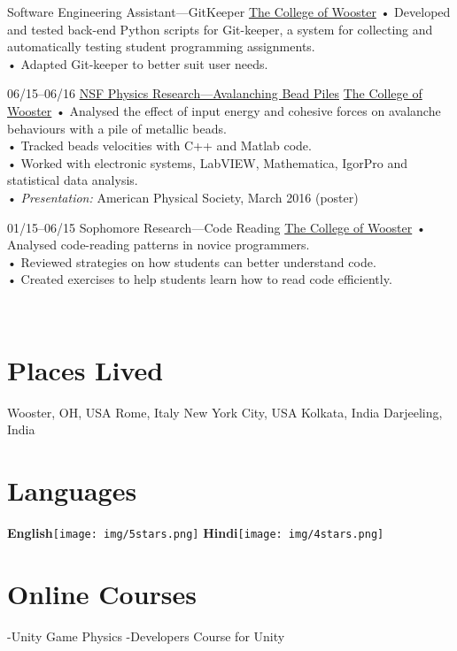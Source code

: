 \documentclass[]{friggeri-cv}
\begin{document}
\begin{entrylist}
    {Software Engineering Assistant—GitKeeper}
    {\href{https://www.wooster.edu/}{The College of Wooster}}
    {•  Developed and tested back-end Python scripts for Git-keeper, a system for collecting and automatically testing student programming assignments. \\
    •   Adapted Git-keeper to better suit user needs.\\}

    \entry
    {06/15–06/16}
    {\href{http://physics.wooster.edu/REU/projects.html}{NSF Physics Research—Avalanching Bead Piles}}
    {\href{https://www.wooster.edu/}{The College of Wooster}}
    {
    •	Analysed the effect of input energy and cohesive forces on avalanche behaviours with a pile of metallic beads.\\
    •	Tracked beads velocities with C++ and Matlab code. \\
    •   Worked with electronic systems, LabVIEW, Mathematica, IgorPro and statistical data analysis.\\
    •	\emph{Presentation:} American Physical Society, March 2016 (poster)\\}

    \entry
    {01/15–06/15}
    {Sophomore Research—Code Reading}
    {\href{https://www.wooster.edu/}{The College of Wooster}}
    {
    •	Analysed code-reading patterns in novice programmers.\\
    •	Reviewed strategies on how students can better understand code.\\
    •	Created exercises to help students learn how to read code efficiently.\\
    }
\end{entrylist}

\begin{aside}
~
~
~
~
  \section{Places Lived}
Wooster, OH, USA
Rome, Italy
New York City, USA
Kolkata, India
Darjeeling, India
~
~
~
~
\section{Languages}
\textbf{English}\texttt{[image: img/5stars.png]}
\textbf{Hindi}\texttt{[image: img/4stars.png]}
    ~
    ~
    ~
    ~
    \section{Online Courses}
    -Unity Game Physics
    -Developers Course for Unity
    ~
~
~
\end{aside}
\end{document}
